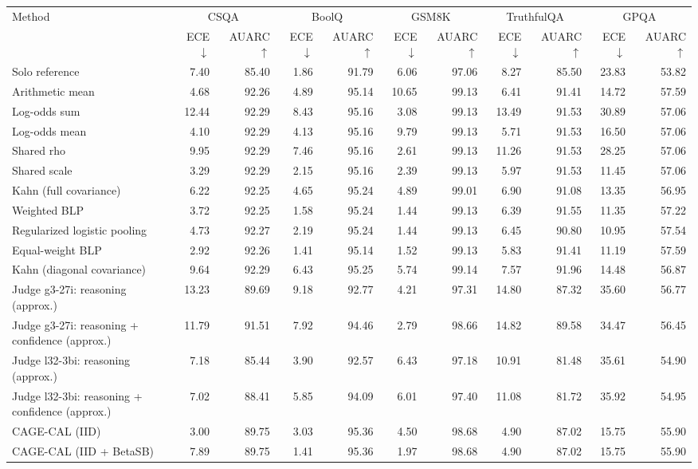 \begin{tabular}{lrrrrrrrrrr}
\toprule
Method & \multicolumn{2}{c}{CSQA} & \multicolumn{2}{c}{BoolQ} & \multicolumn{2}{c}{GSM8K} & \multicolumn{2}{c}{TruthfulQA} & \multicolumn{2}{c}{GPQA} \\
 & ECE $\downarrow$ & AUARC $\uparrow$ & ECE $\downarrow$ & AUARC $\uparrow$ & ECE $\downarrow$ & AUARC $\uparrow$ & ECE $\downarrow$ & AUARC $\uparrow$ & ECE $\downarrow$ & AUARC $\uparrow$ \\
\midrule
Solo reference & 7.40 & 85.40 & 1.86 & 91.79 & 6.06 & 97.06 & 8.27 & 85.50 & 23.83 & 53.82 \\
Arithmetic mean & 4.68 & 92.26 & 4.89 & 95.14 & 10.65 & 99.13 & 6.41 & 91.41 & 14.72 & 57.59 \\
Log-odds sum & 12.44 & 92.29 & 8.43 & 95.16 & 3.08 & 99.13 & 13.49 & 91.53 & 30.89 & 57.06 \\
Log-odds mean & 4.10 & 92.29 & 4.13 & 95.16 & 9.79 & 99.13 & 5.71 & 91.53 & 16.50 & 57.06 \\
Shared rho & 9.95 & 92.29 & 7.46 & 95.16 & 2.61 & 99.13 & 11.26 & 91.53 & 28.25 & 57.06 \\
Shared scale & 3.29 & 92.29 & 2.15 & 95.16 & 2.39 & 99.13 & 5.97 & 91.53 & 11.45 & 57.06 \\
Kahn (full covariance) & 6.22 & 92.25 & 4.65 & 95.24 & 4.89 & 99.01 & 6.90 & 91.08 & 13.35 & 56.95 \\
Weighted BLP & 3.72 & 92.25 & 1.58 & 95.24 & 1.44 & 99.13 & 6.39 & 91.55 & 11.35 & 57.22 \\
Regularized logistic pooling & 4.73 & 92.27 & 2.19 & 95.24 & 1.44 & 99.13 & 6.45 & 90.80 & 10.95 & 57.54 \\
Equal-weight BLP & 2.92 & 92.26 & 1.41 & 95.14 & 1.52 & 99.13 & 5.83 & 91.41 & 11.19 & 57.59 \\
Kahn (diagonal covariance) & 9.64 & 92.29 & 6.43 & 95.25 & 5.74 & 99.14 & 7.57 & 91.96 & 14.48 & 56.87 \\
Judge g3-27i: reasoning (approx.) & 13.23 & 89.69 & 9.18 & 92.77 & 4.21 & 97.31 & 14.80 & 87.32 & 35.60 & 56.77 \\
Judge g3-27i: reasoning + confidence (approx.) & 11.79 & 91.51 & 7.92 & 94.46 & 2.79 & 98.66 & 14.82 & 89.58 & 34.47 & 56.45 \\
Judge l32-3bi: reasoning (approx.) & 7.18 & 85.44 & 3.90 & 92.57 & 6.43 & 97.18 & 10.91 & 81.48 & 35.61 & 54.90 \\
Judge l32-3bi: reasoning + confidence (approx.) & 7.02 & 88.41 & 5.85 & 94.09 & 6.01 & 97.40 & 11.08 & 81.72 & 35.92 & 54.95 \\
CAGE-CAL (IID) & 3.00 & 89.75 & 3.03 & 95.36 & 4.50 & 98.68 & 4.90 & 87.02 & 15.75 & 55.90 \\
CAGE-CAL (IID + BetaSB) & 7.89 & 89.75 & 1.41 & 95.36 & 1.97 & 98.68 & 4.90 & 87.02 & 15.75 & 55.90 \\
\bottomrule
\end{tabular}
